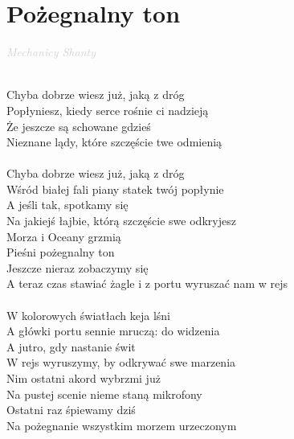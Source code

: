 \documentclass[a5paper, 10pt]{book}
\begin{document}
\section{Pożegnalny ton}\textcolor{lightgray}{\textit{Mechanicy Shanty}}\\~\\
\begin{minipage}[t]{0.75\textwidth}
Chyba dobrze wiesz już, jaką z dróg\\
Popłyniesz, kiedy serce rośnie ci nadzieją\\
Że jeszcze są schowane gdzieś\\
Nieznane lądy, które szczęście twe odmienią\\
\\
Chyba dobrze wiesz już, jaką z dróg\\
Wśród białej fali piany statek twój popłynie\\
A jeśli tak, spotkamy się\\
Na jakiejś łajbie, którą szczęście swe odkryjesz\\

\hspace*{5mm}Morza i Oceany grzmią\\
\hspace*{5mm}Pieśni pożegnalny ton\\
\hspace*{5mm}Jeszcze nieraz zobaczymy się\\
\hspace*{5mm}A teraz czas stawiać żagle i z portu wyruszać nam w rejs\\
\\
W kolorowych światłach keja lśni\\
A główki portu sennie mruczą: do widzenia\\
A jutro, gdy nastanie świt\\
W rejs wyruszymy, by odkrywać swe marzenia\\

Nim ostatni akord wybrzmi już\\
Na pustej scenie nieme staną mikrofony\\
Ostatni raz śpiewamy dziś\\
Na pożegnanie wszystkim morzem urzeczonym\\
\end{minipage}
\end{document}
